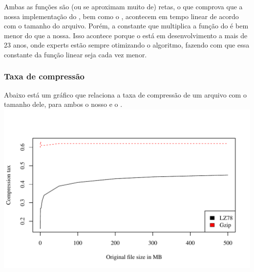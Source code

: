 Ambas as funções são (ou se aproximam muito de) retas, o que comprova que a
nossa implementação do \lz, bem como o \gzip, acontecem em tempo linear de
acordo com o tamanho do arquivo. Porém, a constante que multiplica a função do
\gzip é bem menor do que a nossa. Isso acontece porque o \gzip está em
desenvolvimento a mais de 23 anos, onde experts estão sempre otimizando o
algoritmo, fazendo com que essa constante da função linear seja cada vez menor.

\subsubsection{Taxa de compressão}

Abaixo está um gráfico que relaciona a taxa de compressão de um  arquivo com o
tamanho dele, para ambos o nosso \lz e o \gzip.
\\
\includegraphics[scale=0.74]{../experiments/R/pdf/comp_tax}
\\


